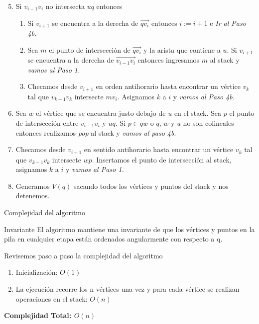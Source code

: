\documentclass[aspectratio=169,xcolor=dvipsnames, t]{beamer}
\begin{document}
\begin{frame}{}
    \begin{enumerate}
     \setcounter{enumi}{4} 
            \item Si $v_{i-1}v_{i}$ no intersecta $uq$ entonces
                \begin{enumerate}
                    \item Si $v_{i+1}$ se encuentra a la derecha de $\overrightarrow{qv_{i}}$ entonces $i := i + 1$ e \textit{Ir al Paso 4b.}
                    \item Sea $m$ el punto de intersección de $\overrightarrow{qv_{i}}$ y la arista que contiene a $u$. Si $v_{i+1}$ se encuentra a la derecha de $\overrightarrow{v_{i-1}v_{i}}$ entonces ingresamos $m$ al stack y \textit{vamos al Paso 1.}
                    \item Checamos desde $v_{i+1}$ en orden antihorario hasta encontrar un vértice $v_{k}$ tal que $v_{k-1}v_{k}$ intersecte $mv_{i}$. Asignamos $k$ a $i$ y \textit{vamos al Paso 4b.}
                \end{enumerate}
            \item Sea $w$ el vértice que se encuentra justo debajo de $u$ en el stack. Sea $p$ el punto de intersección entre $v_{i-1}v_{i}$ y $uq$. Si $p \in qw$ o $q$, $w$ y $u$ no son colineales entonces realizamos \textit{pop} al stack y \textit{vamos al paso 4b}.
            \item Checamos desde $v_{i+1}$ en sentido antihorario hasta encontrar un vértice $v_{k}$ tal que $v_{k-1}v_{k}$ intersecte $wp$. Insertamos el punto de intersección al stack, asignamos $k$ a $i$ y \textit{vamos al Paso 1.}
            \item Generamos $V(q)$ sacando todos los vértices y puntos del stack y nos detenemos.
    \end{enumerate}
\end{frame}




\begin{frame}{Complejidad del algoritmo}
    \begin{block}{Invariante}
         El algoritmo mantiene una invariante de que los vértices y puntos en la pila en cualquier etapa están ordenados angularmente con respecto a q.
    \end{block}    
    \vspace{0.5cm}
    Revisemos paso a paso la complejidad del algoritmo
        \begin{enumerate}
            \item Inicialización: $O(1)$
            \item La ejecución recorre los n vértices una vez y para cada vértice se realizan operaciones en el stack: $O(n)$
        \end{enumerate}
    \begin{center}
        \textbf{Complejidad Total: $O(n)$}
    \end{center}
\end{frame}
\end{document}
